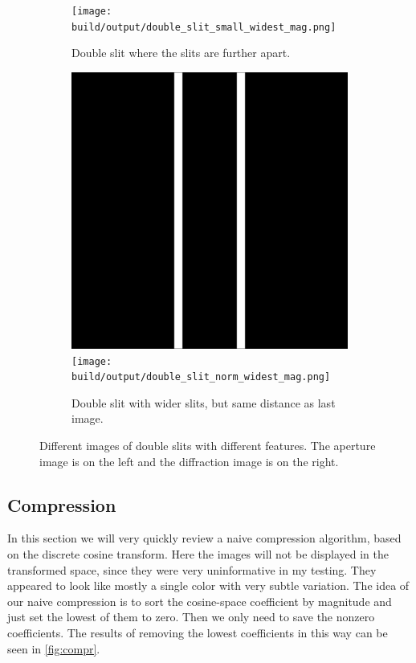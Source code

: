 \begin{figure}[htbp]
\begin{subfigure}[h]{\linewidth}
        \texttt{[image: build/output/double\_slit\_small\_widest\_mag.png]}
        \caption{Double slit where the slits are further apart.}
    \end{subfigure}
    \begin{subfigure}[h]{\linewidth}
        \centering
        \includegraphics[width=.49\linewidth]{images/double_slit_norm_widest.png}
        \texttt{[image: build/output/double\_slit\_norm\_widest\_mag.png]}
        \caption{Double slit with wider slits, but same distance as last image.}
    \end{subfigure}
    \caption{Different images of double slits with different features. The aperture image is on the left and the diffraction image is on the right.}
    \label{fig:double_slit}
\end{figure}

\subsection{Compression}
In this section we will very quickly review a naive compression algorithm, based on the discrete cosine transform.
Here the images will not be displayed in the transformed space, since they were very uninformative in my testing.
They appeared to look like mostly a single color with very subtle variation.
The idea of our naive compression is to sort the cosine-space coefficient by magnitude and just
set the lowest of them to zero. Then we only need to save the nonzero coefficients.
The results of removing the lowest coefficients in this way can be seen in \autoref{fig:compr}.

